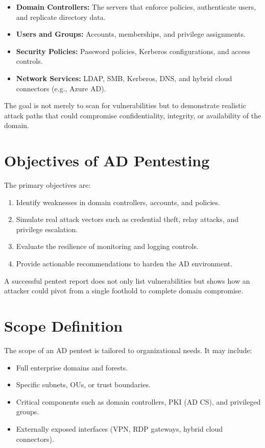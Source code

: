 \begin{itemize}
  \item \textbf{Domain Controllers:} The servers that enforce policies, authenticate users, and replicate directory data.
  \item \textbf{Users and Groups:} Accounts, memberships, and privilege assignments.
  \item \textbf{Security Policies:} Password policies, Kerberos configurations, and access controls.
  \item \textbf{Network Services:} LDAP, SMB, Kerberos, DNS, and hybrid cloud connectors (e.g., Azure AD).
\end{itemize}

The goal is not merely to scan for vulnerabilities but to demonstrate realistic attack paths that could compromise confidentiality, integrity, or availability of the domain.

\section{Objectives of AD Pentesting}
The primary objectives are:
\begin{enumerate}
  \item Identify weaknesses in domain controllers, accounts, and policies.
  \item Simulate real attack vectors such as credential theft, relay attacks, and privilege escalation.
  \item Evaluate the resilience of monitoring and logging controls.
  \item Provide actionable recommendations to harden the AD environment.
\end{enumerate}

A successful pentest report does not only list vulnerabilities but shows how an attacker could pivot from a single foothold to complete domain compromise.

\section{Scope Definition}
The scope of an AD pentest is tailored to organizational needs. It may include:
\begin{itemize}
  \item Full enterprise domains and forests.
  \item Specific subnets, OUs, or trust boundaries.
  \item Critical components such as domain controllers, PKI (AD CS), and privileged groups.
  \item Externally exposed interfaces (VPN, RDP gateways, hybrid cloud connectors).
\end{itemize}


